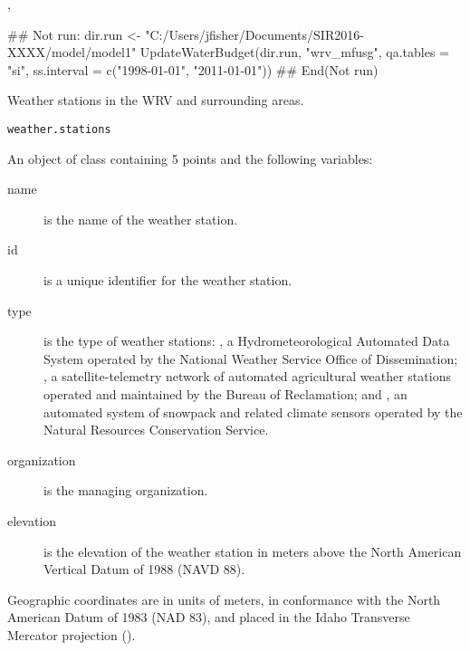 \documentclass[a4paper]{book}
\begin{document}
%
\begin{SeeAlso}\relax
{}, 
\end{SeeAlso}
%
\begin{Examples}
\begin{ExampleCode}
## Not run: 
dir.run <- "C:/Users/jfisher/Documents/SIR2016-XXXX/model/model1"
UpdateWaterBudget(dir.run, "wrv_mfusg", qa.tables = "si",
                  ss.interval = c("1998-01-01", "2011-01-01"))
## End(Not run)
\end{ExampleCode}
\end{Examples}
%
\begin{Description}\relax
Weather stations in the WRV and surrounding areas.
\end{Description}
%
\begin{Usage}
\begin{verbatim}
weather.stations
\end{verbatim}
\end{Usage}
%
\begin{Format}
An object of  class containing 5 points and the following variables:
\begin{description}

\item[name] is the name of the weather station.
\item[id] is a unique identifier for the weather station.
\item[type] is the type of weather stations:
, a Hydrometeorological Automated Data System operated by the National Weather Service Office of Dissemination;
, a satellite-telemetry network of automated agricultural weather stations operated and maintained by the Bureau of Reclamation; and
, an automated system of snowpack and related climate sensors operated by the Natural Resources Conservation Service.
\item[organization] is the managing organization.
\item[elevation] is the elevation of the weather station in meters above the North American Vertical Datum of 1988 (NAVD 88).

\end{description}

Geographic coordinates are in units of meters, in conformance with the North American Datum of 1983 (NAD 83), and placed in the
Idaho Transverse Mercator projection ().
\end{Format}
\end{document}
